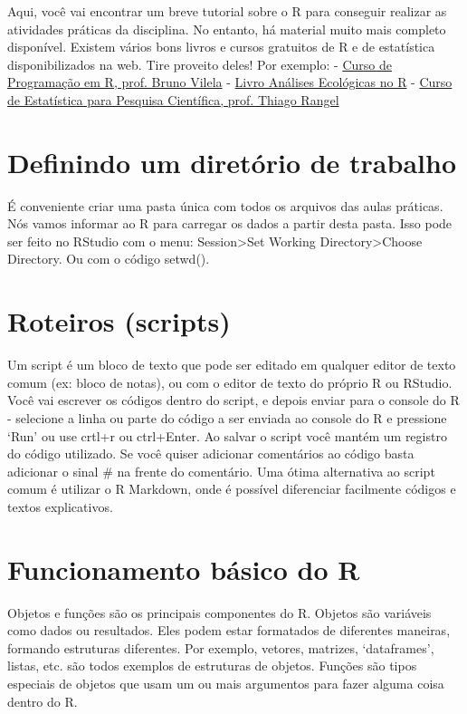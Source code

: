 \documentclass[
]{book}
\begin{document}
Aqui, você vai encontrar um breve tutorial sobre o R para conseguir realizar as atividades práticas da disciplina.
No entanto, há material muito mais completo disponível.
Existem vários bons livros e cursos gratuitos de R e de estatística disponibilizados na web.
Tire proveito deles!
Por exemplo: - \href{https://www.youtube.com/playlist?list=PL3U7PUKvYnzAZAEoFcjGLVkIML2ZGGl6t}{Curso de Programação em R, prof. Bruno Vilela} - \href{https://analises-ecologicas.com/}{Livro Análises Ecológicas no R} - \href{http://estat.bio.br/}{Curso de Estatística para Pesquisa Científica, prof. Thiago Rangel}

\section{Definindo um diretório de trabalho}\label{definindo-um-diretuxf3rio-de-trabalho}

É conveniente criar uma pasta única com todos os arquivos das aulas práticas.
Nós vamos informar ao R para carregar os dados a partir desta pasta.
Isso pode ser feito no RStudio com o menu: Session\textgreater Set Working Directory\textgreater Choose Directory.
Ou com o código setwd().

\section{Roteiros (scripts)}\label{roteiros-scripts}

Um script é um bloco de texto que pode ser editado em qualquer editor de texto comum (ex: bloco de notas), ou com o editor de texto do próprio R ou RStudio.
Você vai escrever os códigos dentro do script, e depois enviar para o console do R - selecione a linha ou parte do código a ser enviada ao console do R e pressione `Run' ou use crtl+r ou ctrl+Enter.
Ao salvar o script você mantém um registro do código utilizado.
Se você quiser adicionar comentários ao código basta adicionar o sinal \# na frente do comentário.
Uma ótima alternativa ao script comum é utilizar o R Markdown, onde é possível diferenciar facilmente códigos e textos explicativos.

\section{Funcionamento básico do R}\label{funcionamento-buxe1sico-do-r}

Objetos e funções são os principais componentes do R.
Objetos são variáveis como dados ou resultados.
Eles podem estar formatados de diferentes maneiras, formando estruturas diferentes.
Por exemplo, vetores, matrizes, `dataframes', listas, etc. são todos exemplos de estruturas de objetos.
Funções são tipos especiais de objetos que usam um ou mais argumentos para fazer alguma coisa dentro do R.
\end{document}

